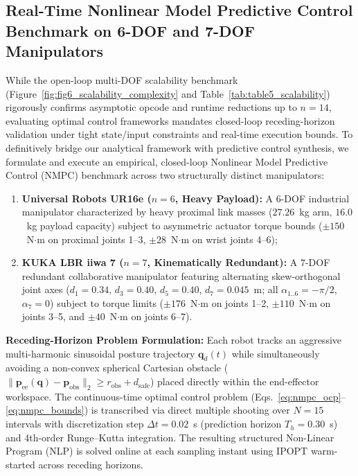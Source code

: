 
\subsection*{Real-Time Nonlinear Model Predictive Control Benchmark on 6-DOF and 7-DOF Manipulators}

While the open-loop multi-DOF scalability benchmark (Figure~\ref{fig:fig6_scalability_complexity} and Table~\ref{tab:table5_scalability}) rigorously confirms asymptotic opcode and runtime reductions up to $n=14$, evaluating optimal control frameworks mandates closed-loop receding-horizon validation under tight state/input constraints and real-time execution bounds. To definitively bridge our analytical framework with predictive control synthesis, we formulate and execute an empirical, closed-loop Nonlinear Model Predictive Control (NMPC) benchmark across two structurally distinct manipulators:
\begin{enumerate}
	\item \textbf{Universal Robots UR16e ($n=6$, Heavy Payload):} A 6-DOF industrial manipulator characterized by heavy proximal link masses ($27.26$~kg arm, $16.0$~kg payload capacity) subject to asymmetric actuator torque bounds ($\pm 150$~N$\cdot$m on proximal joints 1--3, $\pm 28$~N$\cdot$m on wrist joints 4--6);
	\item \textbf{KUKA LBR iiwa 7 ($n=7$, Kinematically Redundant):} A 7-DOF redundant collaborative manipulator featuring alternating skew-orthogonal joint axes ($d_1=0.34$, $d_3=0.40$, $d_5=0.40$, $d_7=0.045$~m; all $\alpha_{1..6}=-\pi/2$, $\alpha_7=0$) subject to torque limits ($\pm 176$~N$\cdot$m on joints 1--2, $\pm 110$~N$\cdot$m on joints 3--5, and $\pm 40$~N$\cdot$m on joints 6--7).
\end{enumerate}

\noindent\textbf{Receding-Horizon Problem Formulation:} 
Each robot tracks an aggressive multi-harmonic sinusoidal posture trajectory $\bm{q}_d(t)$ while simultaneously avoiding a non-convex spherical Cartesian obstacle ($\|\bm{p}_{\text{ee}}(\bm{q}) - \bm{p}_{\text{obs}}\|_2 \ge r_{\text{obs}} + d_{\text{safe}}$) placed directly within the end-effector workspace. The continuous-time optimal control problem (Eqs.~\eqref{eq:nmpc_ocp}--\eqref{eq:nmpc_bounds}) is transcribed via direct multiple shooting over $N=15$ intervals with discretization step $\Delta t = 0.02$~s (prediction horizon $T_h = 0.30$~s) and 4th-order Runge--Kutta integration. The resulting structured Non-Linear Program (NLP) is solved online at each sampling instant using IPOPT warm-started across receding horizons.

